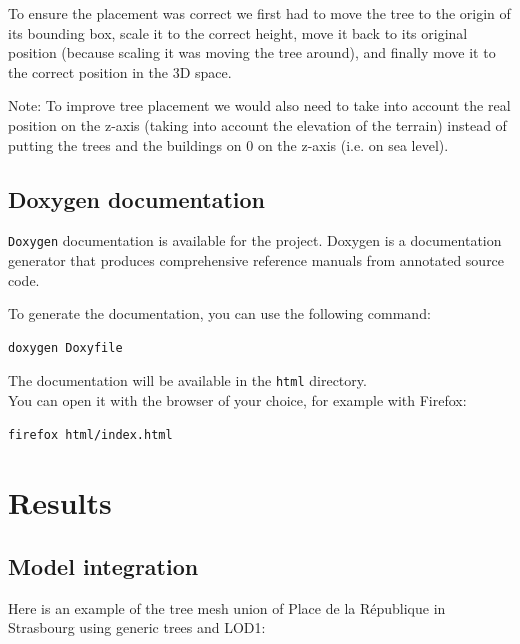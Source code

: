 \documentclass[12pt]{article}
\begin{document}
To ensure the placement was correct we first had to move the tree to the origin
of its bounding box, scale it to the correct height, move it back to its original position
(because scaling it was moving the tree around), and finally move it to the correct position in the 3D space.

Note: To improve tree placement we would also need to take into account the real
position on the z-axis (taking into account the elevation of the terrain) instead
of putting the trees and the buildings on 0 on the z-axis (i.e. on sea level).

\subsection{Doxygen documentation}

\texttt{Doxygen}\cite{doxygen} documentation is available for the project. Doxygen is a
documentation generator that produces comprehensive reference manuals from
annotated source code.

To generate the documentation, you can use the following command:

\begin{lstlisting}[language=bash]
doxygen Doxyfile
\end{lstlisting}

The documentation will be available in the \texttt{html} directory.\\
You can open it with the browser of your choice, for example with Firefox:

\begin{lstlisting}[language=bash]
firefox html/index.html
\end{lstlisting}

\newpage

\section{Results}
\label{sec:Results}
\subsection{Model integration}

Here is an example of the tree mesh union of Place de la République in Strasbourg
using generic trees and LOD1:
\end{document}
